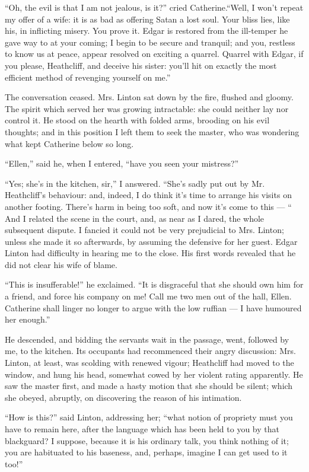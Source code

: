 \par “Oh, the evil is that I am not jealous, is it?” cried Catherine.“Well, I won't repeat my offer of a wife: it is as bad as offering Satan a lost soul. Your bliss lies, like his, in inflicting misery. You prove it. Edgar is restored from the ill-temper he gave way to at your coming; I begin to be secure and tranquil; and you, restless to know us at peace, appear resolved on exciting a quarrel. Quarrel with Edgar, if you please, Heathcliff, and deceive his sister: you'll hit on exactly the most efficient method of revenging yourself on me.”
\par The conversation ceased. Mrs. Linton sat down by the fire, flushed and gloomy. The spirit which served her was growing intractable: she could neither lay nor control it. He stood on the hearth with folded arms, brooding on his evil thoughts; and in this position I left them to seek the master, who was wondering what kept Catherine below so long.
\par “Ellen,” said he, when I entered, “have you seen your mistress?”
\par “Yes; she's in the kitchen, sir,” I answered. “She's sadly put out by Mr. Heathcliff's behaviour: and, indeed, I do think it's time to arrange his visits on another footing. There's harm in being too soft, and now it's come to this — “ And I related the scene in the court, and, as near as I dared, the whole subsequent dispute. I fancied it could not be very prejudicial to Mrs. Linton; unless she made it so afterwards, by assuming the defensive for her guest. Edgar Linton had difficulty in hearing me to the close. His first words revealed that he did not clear his wife of blame.
\par “This is insufferable!” he exclaimed. “It is disgraceful that she should own him for a friend, and force his company on me! Call me two men out of the hall, Ellen. Catherine shall linger no longer to argue with the low ruffian — I have humoured her enough.”
\par He descended, and bidding the servants wait in the passage, went, followed by me, to the kitchen. Its occupants had recommenced their angry discussion: Mrs. Linton, at least, was scolding with renewed vigour; Heathcliff had moved to the window, and hung his head, somewhat cowed by her violent rating apparently. He saw the master first, and made a hasty motion that she should be silent; which she obeyed, abruptly, on discovering the reason of his intimation.
\par “How is this?” said Linton, addressing her; “what notion of propriety must you have to remain here, after the language which has been held to you by that blackguard? I suppose, because it is his ordinary talk, you think nothing of it; you are habituated to his baseness, and, perhaps, imagine I can get used to it too!”
